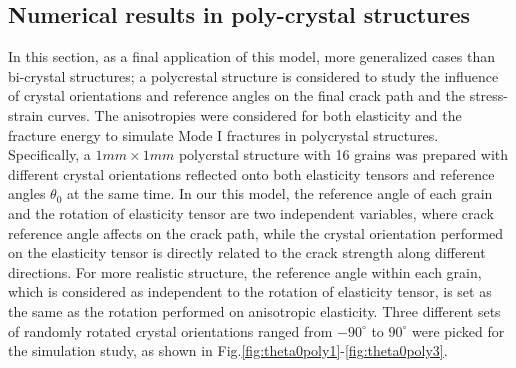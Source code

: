 \documentclass[3p,10pt,sort&compress]{elsarticle}
\begin{document}
\subsection{Numerical results in poly-crystal structures}
In this section, as a final application of this model, more generalized cases than bi-crystal structures; a polycrestal structure is considered to study the influence of crystal orientations and reference angles on the final crack path and the stress-strain curves. The anisotropies were considered for both elasticity and the fracture energy to simulate Mode I fractures in polycrystal structures. Specifically, a $1mm\times 1mm$ polycrstal structure with 16 grains was prepared with different crystal orientations reflected onto both elasticity tensors and reference angles $\theta_0$ at the same time. In our this model, the reference angle of each grain and the rotation of elasticity tensor are two independent variables, where crack reference angle affects on the crack path, while the crystal orientation performed on the elasticity tensor is directly related to the crack strength along different directions. For more realistic structure, the reference angle within each grain, which is considered as independent to the rotation of elasticity tensor, is set as the same as the rotation performed on anisotropic elasticity. Three different sets of randomly rotated crystal orientations ranged from $-90^{\circ} $ to $90^{\circ}$ were picked for the simulation study, as shown in Fig.\ref{fig:theta0poly1}-\ref{fig:theta0poly3}.
\end{document}
